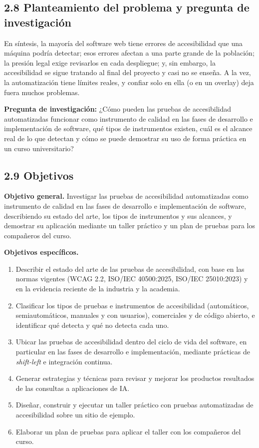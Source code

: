 \documentclass[10pt,letterpaper,onecolumn]{IEEEtran}
\begin{document}
\subsection{2.8 Planteamiento del problema y pregunta de investigación}\label{planteamiento-del-problema-y-pregunta-de-investigaciuxf3n}

En síntesis, la mayoría del software web tiene errores de accesibilidad que una máquina podría detectar; esos errores afectan a una parte grande de la población; la presión legal exige revisarlos en cada despliegue; y, sin embargo, la accesibilidad se sigue tratando al final del proyecto y casi no se enseña. A la vez, la automatización tiene límites reales, y confiar solo en ella (o en un overlay) deja fuera muchos problemas.

\textbf{Pregunta de investigación:} ¿Cómo pueden las pruebas de accesibilidad automatizadas funcionar como instrumento de calidad en las fases de desarrollo e implementación de software, qué tipos de instrumentos existen, cuál es el alcance real de lo que detectan y cómo se puede demostrar su uso de forma práctica en un curso universitario?

\subsection{2.9 Objetivos}\label{objetivos}

\textbf{Objetivo general.} Investigar las pruebas de accesibilidad automatizadas como instrumento de calidad en las fases de desarrollo e implementación de software, describiendo su estado del arte, los tipos de instrumentos y sus alcances, y demostrar su aplicación mediante un taller práctico y un plan de pruebas para los compañeros del curso.

\textbf{Objetivos específicos.}

\begin{enumerate}
\def\labelenumi{\arabic{enumi}.}
\item
  Describir el estado del arte de las pruebas de accesibilidad, con base en las normas vigentes (WCAG 2.2, ISO/IEC 40500:2025, ISO/IEC 25010:2023) y en la evidencia reciente de la industria y la academia.
\item
  Clasificar los tipos de pruebas e instrumentos de accesibilidad (automáticos, semiautomáticos, manuales y con usuarios), comerciales y de código abierto, e identificar qué detecta y qué no detecta cada uno.
\item
  Ubicar las pruebas de accesibilidad dentro del ciclo de vida del software, en particular en las fases de desarrollo e implementación, mediante prácticas de \emph{shift-left} e integración continua.
\item
  Generar estrategias y técnicas para revisar y mejorar los productos resultados de las consultas a aplicaciones de IA.
\item
  Diseñar, construir y ejecutar un taller práctico con pruebas automatizadas de accesibilidad sobre un sitio de ejemplo.
\item
  Elaborar un plan de pruebas para aplicar el taller con los compañeros del curso.
\end{enumerate}
\end{document}
